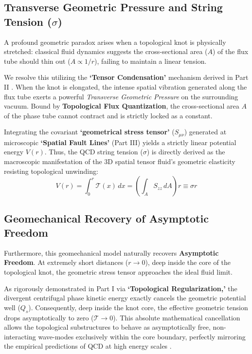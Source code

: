 \documentclass[reprint,amsmath,amssymb,aps,prd]{revtex4-2}
\begin{document}
\subsection{Transverse Geometric Pressure and String Tension ($\sigma$)}
A profound geometric paradox arises when a topological knot is physically stretched: classical fluid dynamics suggests the cross-sectional area ($A$) of the flux tube should thin out ($A \propto 1/r$), failing to maintain a linear tension.

We resolve this utilizing the \textbf{`Tensor Condensation'} mechanism derived in Part II \cite{YooPart2}. When the knot is elongated, the intense spatial vibration generated along the flux tube exerts a powerful \textit{Transverse Geometric Pressure} on the surrounding vacuum. Bound by \textbf{Topological Flux Quantization}, the cross-sectional area $A$ of the phase tube cannot contract and is strictly locked as a constant.

Integrating the covariant \textbf{`geometrical stress tensor'} ($S_{\mu\nu}$) generated at microscopic \textbf{`Spatial Fault Lines'} (Part III) \cite{YooPart3} yields a strictly linear potential energy $V(r)$. Thus, the QCD string tension ($\sigma$) \cite{Wilson1974} is directly derived as the macroscopic manifestation of the 3D spatial tensor fluid's geometric elasticity resisting topological unwinding:
\begin{equation}
V(r) = \int_{0}^{r} \mathcal{T}(x) \, dx = \left( \int_A S_{zz} \, dA \right) r \equiv \sigma r
\end{equation}

\subsection{Geomechanical Recovery of Asymptotic Freedom}
Furthermore, this geomechanical model naturally recovers \textbf{Asymptotic Freedom}. At extremely short distances ($r \to 0$), deep inside the core of the topological knot, the geometric stress tensor approaches the ideal fluid limit.

As rigorously demonstrated in Part I \cite{YooPart1} via \textbf{`Topological Regularization,'} the divergent centrifugal phase kinetic energy exactly cancels the geometric potential well ($Q_s$). Consequently, deep inside the knot core, the effective geometric tension drops asymptotically to zero ($\mathcal{T} \to 0$). This absolute mathematical cancellation allows the topological substructures to behave as asymptotically free, non-interacting wave-modes exclusively within the core boundary, perfectly mirroring the empirical predictions of QCD at high energy scales \cite{Gross1973}.
\end{document}
